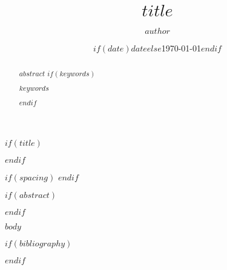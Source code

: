 \documentclass[$if(fontsize)$$fontsize$$else$11pt$endif$$if(titlepage)$, titlepage$endif$$if(prelim)$, prelim$endif$$if(nologo)$, nologo$endif$$if(nocopyright)$, nocopyright$endif$$if(nofunding)$, nofunding$endif$$if(nouid)$, nouid$endif$$if(twoside)$, twoside$endif$]{article}
\title{$title$}
\author{$author$}
\date{$if(date)$$date$$else$\today$endif$}
\begin{document}
$if(title)$
\maketitle
$endif$

$if(spacing)$
$endif$

$if(abstract)$
\begin{abstract}
$abstract$
$if(keywords)$
\begin{keywords}$keywords$\end{keywords}
$endif$
\end{abstract}
$endif$

$body$

$if(bibliography)$


$endif$
\end{document}
